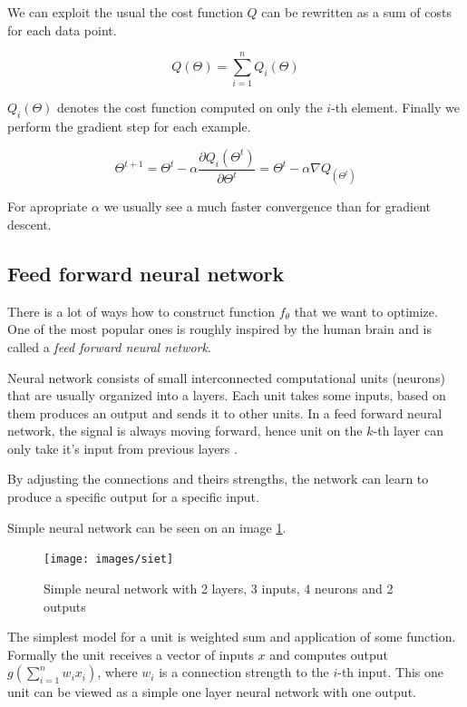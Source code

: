         We can exploit the usual the cost function $Q$ can be rewritten as a sum of costs for each data point.
        
        $$Q(\Theta) = \sum_{i=1}^n Q_i(\Theta)$$
        
        $Q_i(\Theta)$ denotes the cost function computed on only the $i$-th element. 
        Finally we perform the gradient step for each example. 
        
        $$\Theta^{t+1} = \Theta^t - \alpha \frac{\partial Q_i(\Theta^t)}{\partial \Theta^t} = \Theta^t - \alpha \nabla Q_(\Theta^t)$$
        
        \* 
        For apropriate $\alpha$ we usually see a much faster convergence than for gradient descent.
        
        
        \subsection{Feed forward neural network}
        There is a lot of ways how to construct function $f_\theta$ that we want to optimize. 
        One of the most popular ones is roughly inspired by the human brain and is called a \textit{feed forward neural network}.
        
        Neural network consists of small interconnected computational units (neurons) that are usually organized into a layers.
        Each unit takes some inputs, based on them produces an output and sends it to other units. 
        In a feed forward neural network, the signal is always moving forward,
        hence unit on the $k$-th layer can only take it's input from previous layers \cite{Goodfellow-et-al-2016}.
        
        By adjusting the connections and theirs strengths, the network can learn to produce a specific output for a specific input.
        
        Simple neural network can be seen on an image \ref{obr:siet}.
        
        \begin{figure}
        \centerline{\texttt{[image: images/siet]}}
        \caption[Simple neural network with 2 layers, 3 inputs, 4 neurons and 2 outputs]{Simple neural network with 2 layers, 3 inputs, 4 neurons and 2 outputs\*} %
        \label{obr:siet}
        \end{figure}
        
        The simplest model for a unit is weighted sum and application of some function. 
        Formally the unit receives a vector of inputs $x$ and computes output $g(\sum_{i=1}^n w_i x_i)$, 
        where $w_i$ is a connection strength to the $i$-th input.
        This one unit can be viewed as a simple one layer neural network with one output.
        
